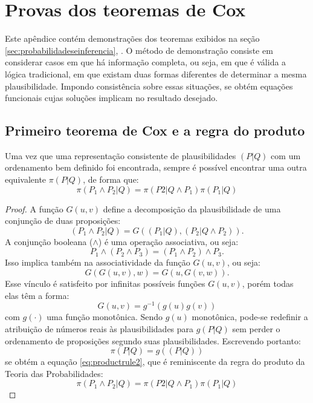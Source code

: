 \chapter{Provas dos teoremas de Cox}
\label{ap:provateoremas}

Este apêndice contém demonstrações dos teoremas exibidos na seção \ref{sec:probabilidadeseinferencia}, \emph{}. O método de demonstração consiste em considerar casos em que há informação completa, ou seja, em que é válida a lógica tradicional, em que existam duas formas diferentes de determinar a mesma plausibilidade. Impondo consistência sobre essas situações, se obtém equações funcionais cujas soluções implicam no resultado desejado. 

\section{Primeiro teorema de Cox e a regra do produto} 
\begin{Teorema}
    Uma vez que uma representação consistente de plausibilidades $(P|Q)$ com um ordenamento bem definido foi encontrada, sempre é possível encontrar uma outra equivalente $\pi(P|Q)$, de forma que:
    \begin{equation}
	\label{eq:productrule2}
	\pi(P_1\wedge P_2|Q) = \pi(P2 | Q \wedge P_1) \pi(P_1| Q)
    \end{equation}
\begin{proof}
A função $G(u,v)$ define a decomposição da plausibilidade de uma conjunção de duas proposições:
\[
 (P_1\wedge P_2|Q) = G((P_1|Q), (P_2|Q\wedge P_2)).
\]
A conjunção booleana ($\wedge$) é uma operação associativa, ou seja:
\[
  P_1\wedge (P_2 \wedge P_3) =  (P_1\wedge P_2) \wedge P_3.
\] 
Isso implica também na associatividade da função $G(u,v)$, ou seja:
\[
  G(G(u,v),w) = G(u,G(v,w)). 
\]
Esse vínculo é satisfeito por infinitas possíveis funções $G(u,v)$, porém todas elas \cite{Aczel1975, ACaticha2008} têm a forma:
\[
  G(u,v)  = g^{-1}(g(u) g(v)) 
\]
com $g(\cdot)$ uma função monotônica. Sendo $g(u)$ monotônica, pode-se redefinir a atribuição de números reais às plausibilidades para $g(P|Q)$ sem perder o ordenamento de proposições segundo suas plausibilidades. Escrevendo portanto:
\[
 \pi(P|Q) = g((P|Q))
\]
se obtém a equação \eqref{eq:productrule2}, que é reminiscente da regra do produto da Teoria das Probabilidades:
\[
  \pi(P_1\wedge P_2|Q) = \pi(P2 | Q \wedge P_1) \pi(P_1| Q)
\]
\end{proof}
\end{Teorema}

